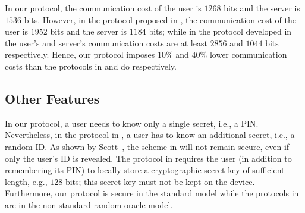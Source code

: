 In our protocol, the communication cost of the user is $1268$ bits and the server is $1536$ bits. However, in the protocol proposed in \cite{WangW18},  the communication cost of the user is $1952$ bits and the server is  $1184$ bits; while in the protocol developed in \cite{JareckiJKSS21} the user's and server's communication costs are at least $2856$ and $1044$ bits respectively. Hence, our protocol imposes $10\%$ and $40\%$ lower communication costs than the protocols in \cite{WangW18} and \cite{JareckiJKSS21} do respectively.


\subsection{Other Features}

 In our protocol, a user needs to know only a single secret, i.e., a  PIN. Nevertheless, in the protocol in \cite{WangW18}, a user has to know an additional secret, i.e., a random ID. As shown by Scott~\cite{Scott12a}, the scheme in \cite{WangW18} will not remain secure, even if only the user's ID is revealed. The protocol in \cite{JareckiJKSS21} requires the user (in addition to remembering its PIN) to locally store a cryptographic secret key of sufficient length, e.g., $128$ bits; this secret key must not be kept on the device. 
 Furthermore, our protocol is secure in the standard model while the protocols in \cite{WangW18,JareckiJKSS21} are in the non-standard random oracle model. 


